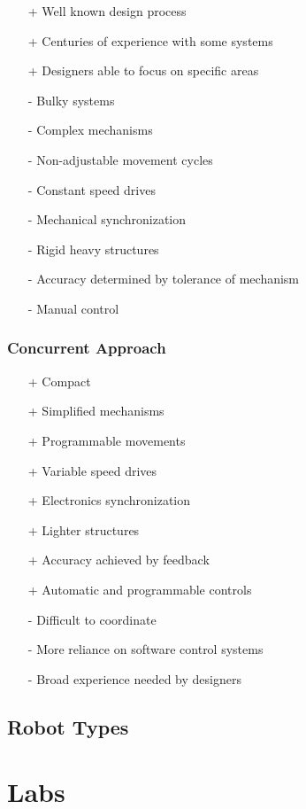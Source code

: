 \documentclass[10pt,a4paper]{scrartcl}
\begin{document}
\begin{multicols*}{2}
\begin{itemize}
\item[+] Well known design process
\item[+] Centuries of experience with some systems
\item[+] Designers able to focus on specific areas
\item[-] Bulky systems
\item[-] Complex mechanisms
\item[-] Non-adjustable movement cycles
\item[-] Constant speed drives
\item[-] Mechanical synchronization
\item[-] Rigid heavy structures
\item[-] Accuracy determined by tolerance of mechanism
\item[-] Manual control
\end{itemize}

\subsubsection{Concurrent Approach}

\begin{itemize}
\item[+] Compact
\item[+] Simplified mechanisms
\item[+] Programmable movements
\item[+] Variable speed drives
\item[+] Electronics synchronization
\item[+] Lighter structures
\item[+] Accuracy achieved by feedback
\item[+] Automatic and programmable controls
\item[-] Difficult to coordinate
\item[-] More reliance on software control systems
\item[-] Broad experience needed by designers
\end{itemize}

\subsection{Robot Types}


\section{Labs}


\end{multicols*}
\end{document}

